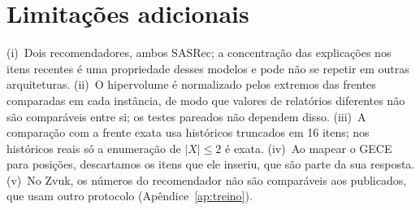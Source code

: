 \section{Limitações adicionais}
\label{ap:limitacoes}

(i)~Dois recomendadores, ambos SASRec; a concentração das explicações nos itens
recentes é uma propriedade desses modelos e pode não se repetir em outras
arquiteturas. (ii)~O hipervolume é normalizado pelos extremos das frentes
comparadas em cada instância, de modo que valores de relatórios diferentes não
são comparáveis entre si; os testes pareados não dependem disso. (iii)~A
comparação com a frente exata usa históricos truncados em 16 itens; nos
históricos reais só a enumeração de $|X|\le2$ é exata. (iv)~Ao mapear o GECE
para posições, descartamos os itens que ele inseriu, que são parte da sua
resposta. (v)~No Zvuk, os números do recomendador não são comparáveis aos
publicados, que usam outro protocolo (Apêndice~\ref{ap:treino}).
